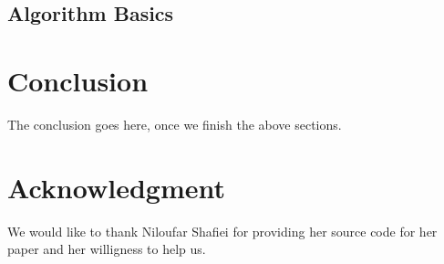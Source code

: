 \documentclass[conference]{IEEEtran}
\begin{document}
\subsection{Algorithm Basics}


\section{Conclusion}
The conclusion goes here, once we finish the above sections.


\section{Acknowledgment}
We would like to thank Niloufar Shafiei for providing her source code for her paper and her willigness to help us.




\end{document}
